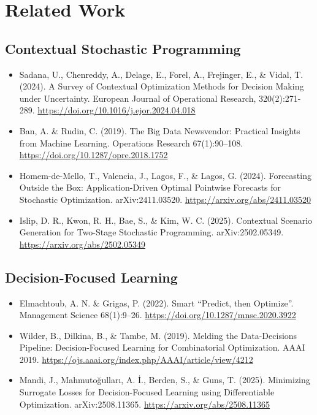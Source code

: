 \documentclass{article}
\begin{document}

\section{Related Work}
\subsection*{Contextual Stochastic Programming}
\begin{itemize}
  \item Sadana, U., Chenreddy, A., Delage, E., Forel, A., Frejinger, E., \& Vidal, T. (2024). A Survey of Contextual Optimization Methods for Decision Making under Uncertainty. European Journal of Operational Research, 320(2):271-289. \url{https://doi.org/10.1016/j.ejor.2024.04.018}
  \item Ban, A. \& Rudin, C. (2019). The Big Data Newsvendor: Practical Insights from Machine Learning. Operations Research 67(1):90–108. \url{https://doi.org/10.1287/opre.2018.1752}
  \item Homem-de-Mello, T., Valencia, J., Lagos, F., \& Lagos, G. (2024). Forecasting Outside the Box: Application-Driven Optimal Pointwise Forecasts for Stochastic Optimization. arXiv:2411.03520. \url{https://arxiv.org/abs/2411.03520}
  \item Islip, D. R., Kwon, R. H., Bae, S., \& Kim, W. C. (2025). Contextual Scenario Generation for Two-Stage Stochastic Programming. arXiv:2502.05349. \url{https://arxiv.org/abs/2502.05349}
\end{itemize}

\subsection*{Decision-Focused Learning}
\begin{itemize}
  \item Elmachtoub, A. N. \& Grigas, P. (2022). Smart “Predict, then Optimize”. Management Science 68(1):9–26. \url{https://doi.org/10.1287/mnsc.2020.3922}
  \item Wilder, B., Dilkina, B., \& Tambe, M. (2019). Melding the Data-Decisions Pipeline: Decision-Focused Learning for Combinatorial Optimization. AAAI 2019. \url{https://ojs.aaai.org/index.php/AAAI/article/view/4212}
  \item Mandi, J., Mahmutoğulları, A. İ., Berden, S., \& Guns, T. (2025). Minimizing Surrogate Losses for Decision-Focused Learning using Differentiable Optimization. arXiv:2508.11365. \url{https://arxiv.org/abs/2508.11365}
\end{itemize}
\end{document}
